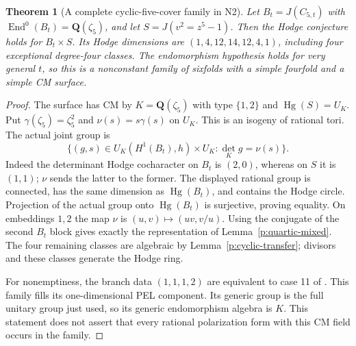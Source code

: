 \documentclass[10pt,reqno]{article}
\theoremstyle{emphasizedplain}
\newtheorem{theorem}{Theorem}[section]
\theoremstyle{emphasizeddefinition}
\theoremstyle{emphasizeddefinition}
\DeclareMathOperator{\End}{End}
\DeclareMathOperator{\Hg}{Hg}
\newcommand{\Q}{\mathbf Q}
\begin{document}
\begin{theorem}[A complete cyclic-five-cover family in N2]\label{p:N2cyclic}
Let $B_t=J(C_{5,t})$ with $\End^0(B_t)=\Q(\zeta_5)$, and let
$S=J(v^2=z^5-1)$. Then the Hodge conjecture holds for $B_t\times S$.
Its Hodge dimensions are $(1,4,12,14,12,4,1)$, including four
exceptional degree-four classes. The endomorphism hypothesis holds
for very general $t$, so this is a nonconstant family of sixfolds
with a simple fourfold and a simple CM surface.
\end{theorem}
\begin{proof}
The surface has CM by $K=\Q(\zeta_5)$ with type $\{1,2\}$ and
$\Hg(S)=U_K$. Put $\gamma(\zeta_5)=\zeta_5^2$ and
$\nu(s)=s\gamma(s)$ on $U_K$. This is an isogeny of rational
tori. The actual joint group is
\[
 \{(g,s)\in U_K(H^1(B_t),h)\times U_K:
                  \det_K g=\nu(s)\}.
\]
Indeed the determinant Hodge cocharacter on $B_t$ is $(2,0)$,
whereas on $S$ it is $(1,1)$; $\nu$ sends the latter to the former.
The displayed rational group is connected, has the same dimension
as $\Hg(B_t)$, and contains the Hodge circle. Projection of the
actual group onto $\Hg(B_t)$ is surjective, proving equality.
On embeddings $1,2$ the map $\nu$ is $(u,v)\mapsto(uv,v/u)$.
Using the conjugate of the second $B_t$ block gives exactly the
representation of Lemma~\ref{p:quartic-mixed}. The four remaining
classes are algebraic by Lemma~\ref{p:cyclic-transfer}; divisors
and these classes generate the Hodge ring.

For nonemptiness, the branch data $(1,1,1,2)$ are equivalent to
case 11 of \cite[Table 1]{MoonenCyclic}. This family fills its
one-dimensional PEL component. Its generic group is the full
unitary group just used, so its generic endomorphism algebra is $K$.
This statement does not assert that every rational polarization
form with this CM field occurs in the family.
\end{proof}
\end{document}
